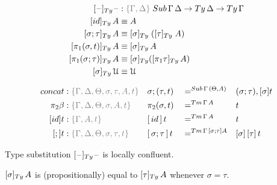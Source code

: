 \documentclass[a4paper,UKenglish,numberwithinsect,cleveref,thm-restate]{lipics-v2021}
\newcommand{\danger}{\marginpar[\hfill\dbend]{\dbend\hfill}}
\begin{document}
\begin{alignat*}{3}
  [\blank]_{\Ty} \blank &: \implicit{\Gamma, \Delta} \; \Sub\,\Gamma\,\Delta \to \Ty\,\Delta \to \Ty\,\Gamma \\
[ \idS ]_{\Ty}\,A             & \jdeq A \\
[ \sigma ; \tau ]_{\Ty}\,A    & \jdeq [ \sigma ]_{\Ty}\;([ \tau ]_{\Ty}\;A) \\
[ \pi_1(\sigma, t) ]_{\Ty}\,A & \jdeq [\sigma]_\Ty\,A \\
[ \pi_1(\sigma; \tau) ]_{\Ty}\,A & \jdeq [\sigma]_\Ty ([\pi_1\tau]_\Ty \,A) \\
[ \sigma ]_{\Ty}\,\UU           & \jdeq \UU
\end{alignat*}

\begin{alignat*}{5}
  \mathsf{concat} & : \implicit{\Gamma, \Delta, \Theta, \sigma, \tau, A, t} &&\sigma ; (\tau , t)      && =^{\Sub\,\Gamma\,(\Theta, A)} &&  (\sigma ; \tau) , [ \sigma ] t \\
  \pi_2\beta      & : \implicit{\Gamma, \Delta, \Theta, \sigma, A, t} && \pi_2(\sigma , t)        && =^{\Tm\,\Gamma\, A} &&  t \\
  [\idS]t         & : \implicit{\Gamma, A, t} && {[\,\idS\,]\,t}          && =^{\Tm\,\Gamma\,A} && t \\
  [;]t            & :\implicit{\Gamma, \Delta, \Theta, \sigma, \tau, t} && {[\,\sigma ; \tau\,]\,t} && =^{\Tm\,\Gamma\,[\sigma ; \tau] A} && {[ \sigma ]\,[ \tau ]\,t} \\
\end{alignat*}

\begin{proposition}
  Type substitution $[\blank]_{\Ty}\blank$ is locally confluent.
  \danger
\end{proposition}
\begin{proposition}[Coherence]
  $[\sigma]_{\Ty}\,A$ is (propositionally) equal to $[\tau]_{\Ty}\,A$ whenever $\sigma = \tau$.
  \danger
\end{proposition}
\end{document}
